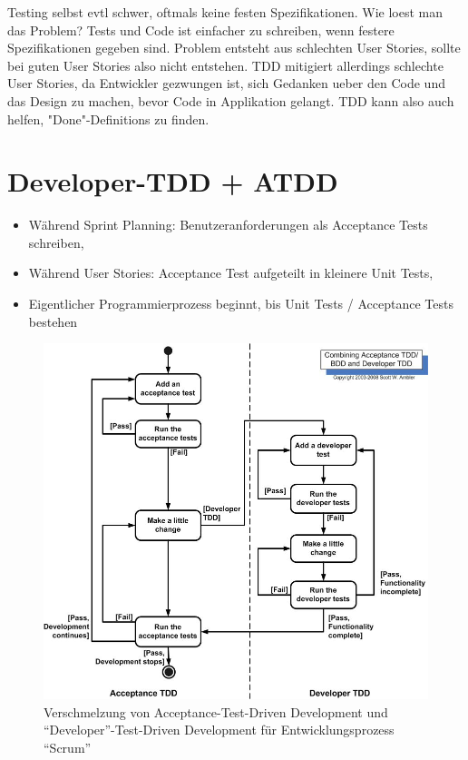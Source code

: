 \documentclass[12pt,DIV14,BCOR10mm,a4paper,twoside,parskip=half-,headsepline,headinclude,english,ngerman,bibliography=totocnumbered]{scrreprt}
\begin{document}
Testing selbst evtl schwer, oftmals keine festen Spezifikationen.
Wie loest man das Problem?
Tests und Code ist einfacher zu schreiben, wenn festere Spezifikationen gegeben sind.
Problem entsteht aus schlechten User Stories, sollte bei guten User Stories also nicht entstehen.
TDD mitigiert allerdings schlechte User Stories, da Entwickler gezwungen ist, sich Gedanken ueber den Code und das Design zu machen, bevor Code in Applikation gelangt.
TDD kann also auch helfen, "Done"-Definitions zu finden.

\section{Developer-TDD + ATDD}

\begin{itemize}
    \item Während Sprint Planning: Benutzeranforderungen als Acceptance Tests schreiben,
    \item Während User Stories: Acceptance Test aufgeteilt in kleinere Unit Tests,
    \item Eigentlicher Programmierprozess beginnt, bis Unit Tests / Acceptance Tests bestehen
\end{itemize}

\begin{figure}[!htb]
    \includegraphics[width=\textwidth,height=0.8\textheight,keepaspectratio]{./images/atdd.jpg}
    \caption{Verschmelzung von Acceptance-Test-Driven Development und \enquote{Developer}-Test-Driven Development für Entwicklungsprozess \enquote{Scrum} \autocite{astels_2003}}
    \label{figure:atdd-dtdd}
\end{figure}
\end{document}
